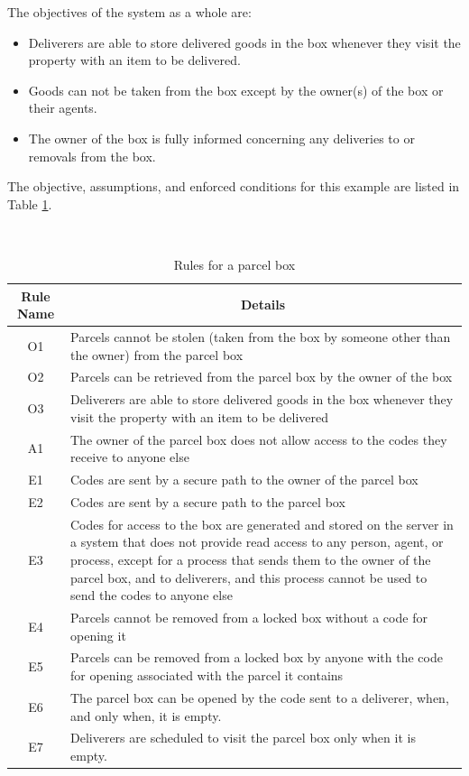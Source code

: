 The objectives of the system as a whole are:
\begin{itemize}
\item Deliverers are able to store delivered goods in the box whenever they visit the
property with an item to be delivered.
\item Goods can not be taken from the box except by the owner(s) of the box or their agents.
\item The owner of the box is fully informed concerning any deliveries to or removals
from the box.
\end{itemize}


The objective, assumptions, and enforced conditions for this example are listed
in Table \ref{parcelrules}.
\begin{table}[tb]
\centering
\caption{Rules for a parcel box}\label{parcelrules}\ \\
\begin{center}
\begin{tabular}{|c|p{6cm}|}
\hline
\bf Rule Name&\multicolumn{1}{|c|}{\bf Details}\\
\hline
O1 & Parcels cannot be stolen (taken from the box by someone other than the owner) from the parcel box\\
O2 & Parcels can be retrieved from the parcel box by the owner of the box\\
O3 & Deliverers are able to store delivered goods in the box whenever they visit the
property with an item to be delivered\\
A1 & The owner of the parcel box does not allow access to the codes they receive to anyone else\\
E1 & Codes are sent by a secure path to the owner of the parcel box\\
E2 & Codes are sent by a secure path to the parcel box\\
E3 & Codes for access to the box are generated and stored on the server in a system that does not 
provide read access to any person, agent, or process, except for a process that sends them to the owner 
of the parcel box, and to deliverers, and this process cannot be used to send the codes to anyone else\\
E4 & Parcels cannot be removed from a locked box without a code for opening it\\
E5 & Parcels can be removed from a locked box by anyone with the code for opening associated with the parcel it contains\\
E6 & The parcel box can be opened by the code sent to a deliverer, when, and only when, it is empty.\\
E7 & Deliverers are scheduled to visit the parcel box only when it is empty.\\
\hline
\end{tabular}
\end{center}
\end{table}

